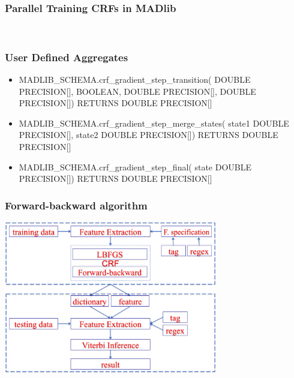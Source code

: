 \documentclass{beamer}
\begin{document}
\begin{frame}
  \frametitle{Parallel Training CRFs in MADlib}
  \\
\end{frame}

\begin{frame}
  \frametitle{User Defined Aggregates}
  \begin{itemize}
\item MADLIB\_SCHEMA.crf\_gradient\_step\_transition(
		DOUBLE PRECISION[],
		BOOLEAN,
		DOUBLE PRECISION[],
		DOUBLE PRECISION[])
	RETURNS DOUBLE PRECISION[]


\item MADLIB\_SCHEMA.crf\_gradient\_step\_merge\_states(
		state1 DOUBLE PRECISION[],
		state2 DOUBLE PRECISION[])
	RETURNS DOUBLE PRECISION[]


\item MADLIB\_SCHEMA.crf\_gradient\_step\_final(
		state DOUBLE PRECISION[])
	RETURNS DOUBLE PRECISION[]
  \end{itemize}
\end{frame}

\begin{frame}
  \frametitle{Forward-backward algorithm}
  \begin{center}
  \includegraphics[height=18em]{system.png}
  \end{center}
\end{frame}
\end{document}
